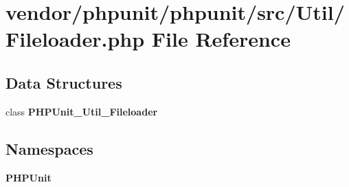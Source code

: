 \section{vendor/phpunit/phpunit/src/\+Util/\+Fileloader.php File Reference}
\label{phpunit_2phpunit_2src_2_util_2_file_loader_8php}
\subsection*{Data Structures}
\begin{DoxyCompactItemize}
\item 
class {\bf P\+H\+P\+Unit\+\_\+\+Util\+\_\+\+Fileloader}
\end{DoxyCompactItemize}
\subsection*{Namespaces}
\begin{DoxyCompactItemize}
\item 
 {\bf P\+H\+P\+Unit}
\end{DoxyCompactItemize}
